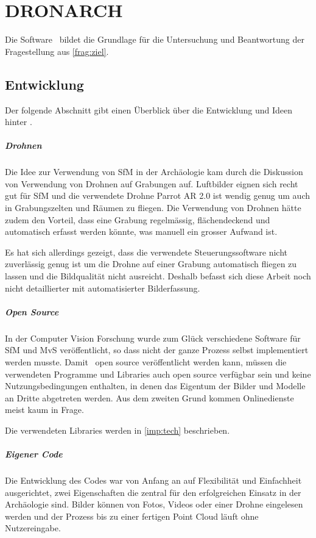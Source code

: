 \chapter{DRONARCH}
	Die Software \dronarch\ bildet die Grundlage für die Untersuchung und Beantwortung der Fragestellung aus \autoref{frag:ziel}.
	\section{Entwicklung}
		Der folgende Abschnitt gibt einen Überblick über die Entwicklung und Ideen hinter \dronarch. %
		
		\paragraph{Drohnen}
		Die Idee zur Verwendung von SfM in der Archäologie kam durch die Diskussion von Verwendung von Drohnen auf Grabungen auf. Luftbilder eignen sich recht gut für SfM  und die verwendete Drohne Parrot AR 2.0 ist wendig genug um auch in Grabungszelten und Räumen zu fliegen. Die Verwendung von Drohnen hätte zudem den Vorteil, dass eine Grabung regelmässig, flächendeckend und automatisch erfasst werden könnte, was manuell ein grosser Aufwand ist.
		
		Es hat sich allerdings gezeigt, dass die verwendete Steuerungssoftware nicht zuverlässig genug ist um die Drohne auf einer Grabung automatisch fliegen zu lassen und die Bildqualität nicht ausreicht.
		Deshalb befasst sich diese Arbeit noch nicht detaillierter mit automatisierter Bilderfassung.
		
		\paragraph{Open Source}
		In der Computer Vision Forschung wurde zum Glück verschiedene Software für SfM und MvS veröffentlicht, so dass nicht der ganze Prozess selbst implementiert werden musste.
		Damit \dronarch\ open source veröffentlicht werden kann, müssen die verwendeten Programme und Libraries auch open source verfügbar sein und keine Nutzungsbedingungen enthalten, in denen das Eigentum der Bilder und Modelle an Dritte abgetreten werden. Aus dem zweiten Grund kommen Onlinedienste meist kaum in Frage.
		
		Die verwendeten Libraries werden in \autoref{imp:tech} beschrieben.
		
		\paragraph{Eigener Code}
		Die Entwicklung des Codes war von Anfang an auf Flexibilität und Einfachheit ausgerichtet, zwei Eigenschaften die zentral für den erfolgreichen Einsatz in der Archäologie sind.
		Bilder können von Fotos, Videos oder einer Drohne eingelesen werden und der Prozess bis zu einer fertigen Point Cloud läuft ohne Nutzereingabe.
		
